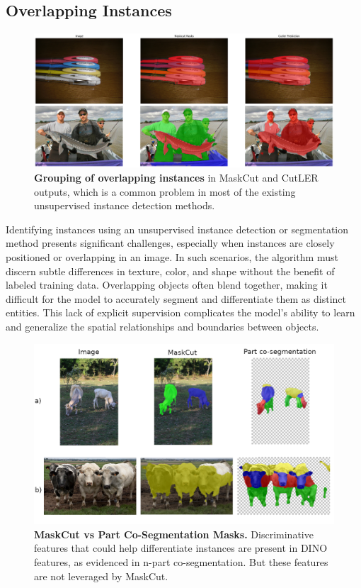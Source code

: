 \subsection{Overlapping Instances}
\begin{figure}
	\centering
	\includegraphics[width=1\textwidth]{Images/main/cutler-prob-overlap.png}
	\caption[\textbf{Cutler's Performance on Images with Overlapping Instances}]{\textbf{Grouping of overlapping instances} in MaskCut and CutLER outputs, which is a common problem in most of the existing unsupervised instance detection methods.}
	\label{fig:cutler_overlapping_instances_eg}
\end{figure}

Identifying instances using an unsupervised instance detection or segmentation method presents significant challenges, especially when instances are closely positioned or overlapping in an image. In such scenarios, the algorithm must discern subtle differences in texture, color, and shape without the benefit of labeled training data. Overlapping objects often blend together, making it difficult for the model to accurately segment and differentiate them as distinct entities. This lack of explicit supervision complicates the model's ability to learn and generalize the spatial relationships and boundaries between objects.

\begin{figure}
	\centering
	\includegraphics[width=1\textwidth]{Images/main/part-cosegm.png}
	\caption[\textbf{MaskCut vs Part Co-Segmentation Masks}]{\textbf{MaskCut vs Part Co-Segmentation Masks.} Discriminative features that could help differentiate instances are present in DINO features, as evidenced in n-part co-segmentation. But these features are not leveraged by MaskCut. }
	\label{fig:maskcut-instance-indifference}
\end{figure}

